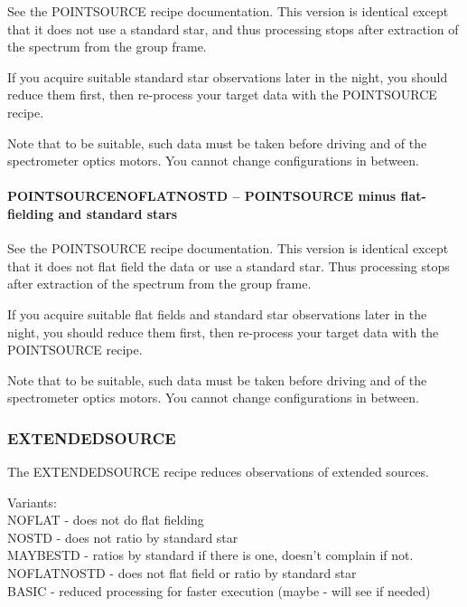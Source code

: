 \documentclass[twoside,11pt]{article}
\renewcommand{\_}{\texttt{\symbol{95}}}
\begin{document}
\mbox{}

See the POINT\_SOURCE recipe documentation. This version is identical
except that it does not use a standard star, and thus processing stops
after extraction of the spectrum from the group frame.



If you acquire suitable standard star observations later in the night,
you should reduce them first, then re-process your target data with
the POINT\_SOURCE recipe.



Note that to be suitable, such data must be taken before driving and
of the spectrometer optics motors. You cannot change configurations
in between.


\paragraph*{POINT\_SOURCE\_NOFLAT\_NOSTD -- POINT\_SOURCE minus flat-fielding and standard stars\label{POINT_SOURCE_NOFLAT_NOSTD_--_POINT_SOURCE_minus_flat-fielding_and_standard_stars}}



\mbox{}

See the POINT\_SOURCE recipe documentation. This version is identical
except that it does not flat field the data or use a standard
star. Thus processing stops after extraction of the spectrum from the
group frame.



If you acquire suitable flat fields and standard star observations
later in the night, you should reduce them first, then re-process your
target data with the POINT\_SOURCE recipe.



Note that to be suitable, such data must be taken before driving and
of the spectrometer optics motors. You cannot change configurations
in between.


\subsubsection{EXTENDED\_SOURCE}

The EXTENDED\_SOURCE recipe reduces observations of extended sources.

Variants: \\
\_NOFLAT - does not do flat fielding \\
\_NOSTD - does not ratio by standard star \\
\_MAYBESTD - ratios by standard if there is one, doesn't complain if not. \\
\_NOFLAT\_NOSTD - does not flat field or ratio by standard star \\
\_BASIC - reduced processing for faster execution (maybe - will see if needed) \\
\end{document}

